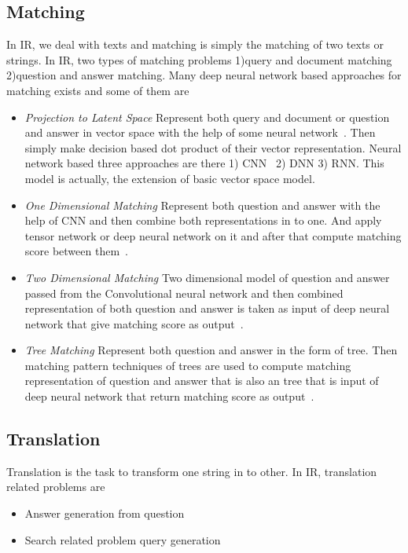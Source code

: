 \documentclass{doublecol-new}
\theoremstyle{TH}{
\newtheorem{lemma}{Lemma}
\newtheorem{theorem}[lemma]{Theorem}
\newtheorem{corrolary}[lemma]{Corrolary}
\newtheorem{conjecture}[lemma]{Conjecture}
\newtheorem{proposition}[lemma]{Proposition}
\newtheorem{claim}[lemma]{Claim}
\newtheorem{stheorem}[lemma]{Wrong Theorem}
\newtheorem{algorithm}{Algorithm}
}
\theoremstyle{THrm}{
\newtheorem{definition}{Definition}[section]
\newtheorem{question}{Question}[section]
\newtheorem{remark}{Remark}
\newtheorem{scheme}{Scheme}
}
\theoremstyle{THhit}{
\newtheorem{case}{Case}[section]
}
\begin{document}
\subsection{Matching}
In IR, we deal with texts and matching is simply the matching of two texts or strings. In IR, two types of matching problems 1)query and document matching 2)question and answer matching. Many deep neural network based approaches for matching exists and some of them are
\begin{itemize}
	\item {\em Projection to Latent Space} Represent both query and document or question and answer in vector space with the help of some neural network~\cite{shen2014latent,severyn2016modeling,lu2013deep}. Then simply make decision based dot product of their vector representation. Neural network based three approaches are there 1) CNN~\cite{shen2014latent,severyn2016modeling} 2) DNN 3) RNN. This model is actually, the extension of basic vector space model. 
	\item {\em One Dimensional Matching} Represent both question and answer with the help of CNN and then combine both representations in to one. And apply tensor network or deep neural network on it and after that compute matching score between them~\cite{qiu2015convolutional,hu2014convolutional}. 
	\item {\em Two Dimensional Matching} Two dimensional model of question and answer passed from the Convolutional neural network and then combined representation of both question and answer is taken as input of deep neural network that give matching score as output~\cite{pang2016text,wan2016deep}.  
	\item {\em Tree Matching} Represent both question and answer in the form of tree. Then matching pattern techniques of trees are used  to compute matching representation of question and answer that is also an tree that is input of deep neural network that return matching score as output~\cite{wang2015syntax}. 
		
\end{itemize}
\subsection{Translation}
Translation is the task to transform one string in to other. In IR, translation related problems are 
\begin{itemize}
	\item Answer generation from question 
	\item Search related problem query generation
\end{itemize}
\end{document}
